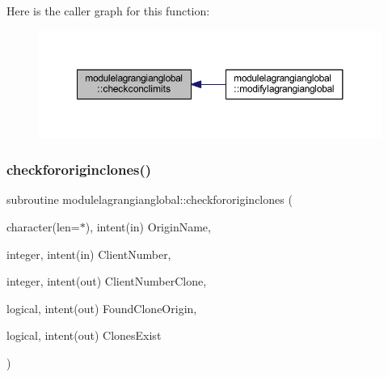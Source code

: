 Here is the caller graph for this function\+:\nopagebreak
\begin{figure}[H]
\begin{center}
\leavevmode
\includegraphics[width=350pt]{namespacemodulelagrangianglobal_a787d28742cbd84ad7a607a488de397e2_icgraph}
\end{center}
\end{figure}
\mbox{\label{namespacemodulelagrangianglobal_a3ffd33996e7947926b76916d8e614ab8}} 
\subsubsection{\texorpdfstring{checkfororiginclones()}{checkfororiginclones()}}
{\footnotesize\ttfamily subroutine modulelagrangianglobal\+::checkfororiginclones (\begin{DoxyParamCaption}\item[{character(len=$\ast$), intent(in)}]{Origin\+Name,  }\item[{integer, intent(in)}]{Client\+Number,  }\item[{integer, intent(out)}]{Client\+Number\+Clone,  }\item[{logical, intent(out)}]{Found\+Clone\+Origin,  }\item[{logical, intent(out)}]{Clones\+Exist }\end{DoxyParamCaption})\hspace{0.3cm}{\ttfamily [private]}}

